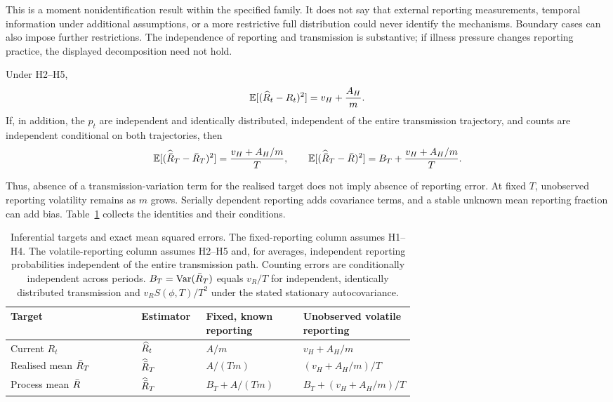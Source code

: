 This is a moment nonidentification result within the specified family. It does not say that external reporting measurements, temporal information under additional assumptions, or a more restrictive full distribution could never identify the mechanisms. Boundary cases can also impose further restrictions. The independence of reporting and transmission is substantive; if illness pressure changes reporting practice, the displayed decomposition need not hold.

\begin{corollary}
\label{cor:report-current}
Under H2--H5,
\begin{equation}
  \mathbb{E}[(\widehat R_t-R_t)^2]=v_H+\frac{A_H}{m}.
  \label{eq:vH-current}
\end{equation}
If, in addition, the $p_t$ are independent and identically distributed, independent of the entire transmission trajectory, and counts are independent conditional on both trajectories, then
\begin{equation}
  \mathbb{E}[(\widehat{\bar R}_T-\bar R_T)^2]=\frac{v_H+A_H/m}{T},\qquad
  \mathbb{E}[(\widehat{\bar R}_T-\bar R)^2]=B_T+\frac{v_H+A_H/m}{T}.
  \label{eq:report-means}
\end{equation}
\end{corollary}

Thus, absence of a transmission-variation term for the realised target does not imply absence of reporting error. At fixed $T$, unobserved reporting volatility remains as $m$ grows. Serially dependent reporting adds covariance terms, and a stable unknown mean reporting fraction can add bias. Table~\ref{tab:targets} collects the identities and their conditions.

\begin{table}[t]
\centering
\small
\setlength{\tabcolsep}{4pt}
\caption{Inferential targets and exact mean squared errors. The fixed-reporting column assumes H1--H4. The volatile-reporting column assumes H2--H5 and, for averages, independent reporting probabilities independent of the entire transmission path. Counting errors are conditionally independent across periods. $B_T=\mathrm{Var}(\bar R_T)$ equals $v_R/T$ for independent, identically distributed transmission and $v_RS(\phi,T)/T^2$ under the stated stationary autocovariance.}
\label{tab:targets}
\begin{tabularx}{\linewidth}{>{\raggedright\arraybackslash}X>{\centering\arraybackslash}p{0.16\linewidth}>{\centering\arraybackslash}p{0.24\linewidth}>{\centering\arraybackslash}p{0.27\linewidth}}
\toprule
Target & Estimator & Fixed, known reporting & Unobserved volatile reporting \\
\midrule
Current $R_t$ & $\widehat R_t$ & $A/m$ & $v_H+A_H/m$ \\
Realised mean $\bar R_T$ & $\widehat{\bar R}_T$ & $A/(Tm)$ & $(v_H+A_H/m)/T$ \\
Process mean $\bar R$ & $\widehat{\bar R}_T$ & $B_T+A/(Tm)$ & $B_T+(v_H+A_H/m)/T$ \\
\bottomrule
\end{tabularx}
\end{table}

